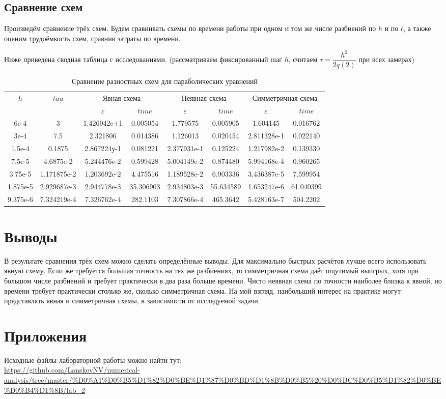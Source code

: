 \documentclass[12pt]{article}
\begin{document}
\subsection{Сравнение схем}
Произведём сравнение трёх схем. Будем сравнивать схемы по времени работы при одном и том же числе разбиений по $h$ и по $t$, а также оценим трудоёмкость схем, сравнив затраты по времени.

Ниже приведена сводная таблица с исследованиями. (рассматриваем фиксированный шаг $h$, считаем $\tau = \dfrac{h^2}{2q(2)}$ при всех замерах)

\begin{table}[H]
\caption{Сравнение разностных схем для параболических уравнений }
\begin{center}
\begin{tabular}{|c|c|c|c|c|c|c|c|}
\hline
\multirow{2}{*}{$h$} & \multirow{2}{*}{$tau$} & \multicolumn{2}{|c|}{Явная схема} & \multicolumn{2}{|c|}{Неявная схема} &\multicolumn{2}{|c|}{Симметричная схема}  \\
\cline{3-8}
& & $\varepsilon$ & $time$ & $\varepsilon$ & $time$ & $\varepsilon$ & $time$ \\
\hline
6e-4 & 3 & 1.426942e+1 & 0.005054 & 1.779575 & 0.005905 & 1.604145 & 0.016762 \\
\hline
3e-4 & 7.5 & 2.321806 & 0.014386 & 1.126013 & 0.020454 & 2.811328e-1 & 0.022140 \\
\hline
1.5e-4 & 0.1875 & 2.867224у-1 & 0.081221 & 2.377931e-1 & 0.125224 & 1.217982e-2 & 0.139330 \\
\hline
7.5e-5 & 4.6875e-2 & 5.244476e-2 & 0.599428 & 5.004149e-2 & 0.874480 & 5.994168e-4 & 0.960265 \\ 
\hline
3.75e-5 & 1.171875e-2 & 1.203692e-2 & 4.475516 & 1.189528e-2 & 6.903336 & 3.436387e-5 & 7.599954 \\
\hline
1.875e-5 & 2.929687e-3 & 2.944778e-3 & 35.306903 & 2.934803e-3 & 55.634589 & 1.653247e-6 & 61.040399 \\
\hline
9.375e-6 & 7.324219e-4 & 7.326762e-4 & 282.1103 & 7.307866e-4 & 465.3642 & 5.428163e-7 & 504.2202 \\
\hline

\end{tabular}
\end{center}
\end{table}

\section{Выводы}
В результате сравнения трёх схем можно сделать определённые выводы. Для максимально быстрых расчётов лучше всего использовать явную схему. Если же требуется большая точность на тех же разбиениях, то симметричная схема даёт ощутимый выигрых, хотя при большом числе разбиений и требует практически в два раза больше времени. Чисто неявная схема по точности наиболее близка к явной, но времени требует практически столько же, сколько симметричная схема. На мой взгляд, наибольший интерес на практике могут представлять явная и симметричная схемы, в зависимости от исследуемой задачи.

\section{Приложения}
Исходные файлы лабораторной работы можно найти тут: \\
\url{https://github.com/LanskovNV/numerical-analysis/tree/master/%D0%A1%D0%B5%D1%82%D0%BE%D1%87%D0%BD%D1%8B%D0%B5%20%D0%BC%D0%B5%D1%82%D0%BE%D0%B4%D1%8B/lab_2}
\end{document}
